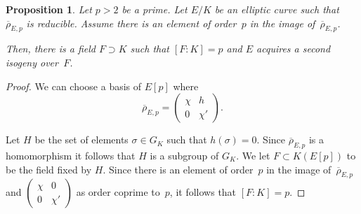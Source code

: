 \documentclass[12pt]{amsart}
\newcommand{\rhobar}{{\overline{\rho}}}
\numberwithin{equation}{section}
\newtheorem{proposition}[theorem]{Proposition}
\theoremstyle{definition}
\theoremstyle{remark}
\begin{document}
\begin{proposition} \label{P:fieldF}
Let $p > 2$ be a prime. Let $E/K$ be an elliptic curve such that 
$\rhobar_{E,p}$ is reducible. Assume there is an element of order~$p$ 
in the image of~$\rhobar_{E,p}$. 

Then, there is a field $F \supset K$ such that $[F : K] = p$ and $E$ acquires a 
second isogeny over~$F$.
\end{proposition}
\begin{proof} We can choose a basis of $E[p]$ where
\[
\rhobar_{E,p} =  \begin{pmatrix}
                            \chi& h \\
                            0 & \chi'
                            \end{pmatrix}.
\]

Let $H$ be the set of elements $\sigma \in  G_K$ such 
that $h(\sigma) = 0$. Since $\rhobar_{E,p}$ is a homomorphism it follows 
that $H$ is a subgroup of $G_K$. 
We let $F \subset K(E[p])$ to be the field fixed by $H$.
Since there is an element of order~$p$ in the image of~$\rhobar_{E,p}$ and 
$\left(\begin{smallmatrix}
                            \chi & 0 \\
                            0 & \chi'
                            \end{smallmatrix} \right)$
as order coprime to~$p$, 
it follows that $[F : K] =p$.
\end{proof}
\end{document}
